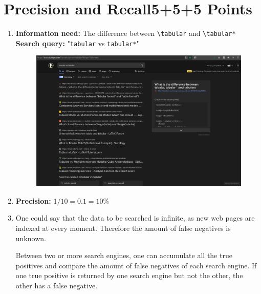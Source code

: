 \documentclass[10pt,a4paper]{article}
\begin{document}
\section{\hfill Precision and Recall\hfill 5+5+5 Points}
\begin{enumerate}
    \item \textbf{Information need:} The difference between \texttt{\textbackslash tabular} and \texttt{\textbackslash tabular*}\\
        \textbf{Search query:} "\texttt{tabular} vs \texttt{tabular*}"
        \begin{figure}[h]
            \centering
            \includegraphics[width=\linewidth]{e03screenshot}
        \end{figure}
    \item \textbf{Precision:} $1/10=0.1=10\% $
    \item One could say that the data to be searched is infinite, as new web pages are indexed at every moment. Therefore the amount of false negatives is unknown.
    
    Between two or more search engines, one can accumulate all the true positives and compare the amount of false negatives of each search engine. If one true positive is returned by one search engine but not the other, the other has a false negative.
\end{enumerate}


\newpage
\end{document}
